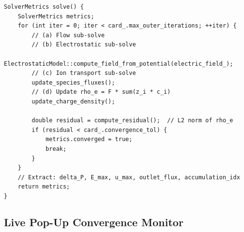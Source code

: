 \documentclass[11pt,a4paper]{article}
\begin{document}
\begin{lstlisting}[style=cpp,title={\textbf{C++ --- Steady-state outer coupling loop}}]
SolverMetrics solve() {
    SolverMetrics metrics;
    for (int iter = 0; iter < card_.max_outer_iterations; ++iter) {
        // (a) Flow sub-solve
        // (b) Electrostatic sub-solve
        ElectrostaticModel::compute_field_from_potential(electric_field_);
        // (c) Ion transport sub-solve
        update_species_fluxes();
        // (d) Update rho_e = F * sum(z_i * c_i)
        update_charge_density();

        double residual = compute_residual();  // L2 norm of rho_e
        if (residual < card_.convergence_tol) {
            metrics.converged = true;
            break;
        }
    }
    // Extract: delta_P, E_max, u_max, outlet_flux, accumulation_idx
    return metrics;
}
\end{lstlisting}

\subsection{Live Pop-Up Convergence Monitor}
\end{document}
